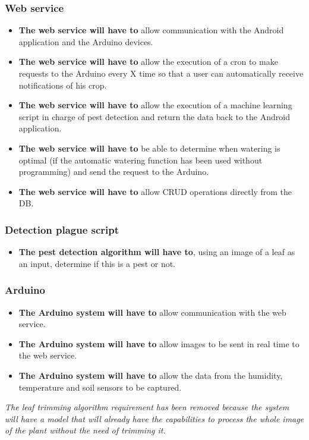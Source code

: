 \documentclass[11pt,a4paper]{article}
\begin{document}
\subsubsection{Web service}
\begin{itemize}
\item \textbf{The web service will have to} allow communication with the Android application and the Arduino devices.

\item \textbf{The web service will have to} allow the execution of a cron to make requests to the Arduino every X time so that a user can automatically receive notifications of his crop.

\item \textbf{The web service will have to} allow the execution of a machine learning script in charge of pest detection and return the data back to the Android application.

\item \textbf{The web service will have to} be able to determine when watering is optimal (if the automatic watering function has been used without programming) and send the request to the Arduino.

\item \textbf{The web service will have to} allow CRUD operations directly from the DB.
\end{itemize}

\subsubsection{Detection plague script}
\begin{itemize}

\item \textbf{The pest detection algorithm will have to}, using an image of a leaf as an input, determine if this is a pest or not.
\end{itemize}

\subsubsection{Arduino}
\begin{itemize}
\item \textbf{The Arduino system will have to} allow communication with the web service.

\item \textbf{The Arduino system will have to} allow images to be sent in real time to the web service.

\item \textbf{The Arduino system will have to} allow the data from the humidity, temperature and soil sensors to be captured.

\end{itemize}
\vspace{1cm}
\textit{The leaf trimming algorithm requirement has been removed because the system will have a model that will already have the capabilities to process the whole image of the plant without the need of trimming it.} 
\end{document}
